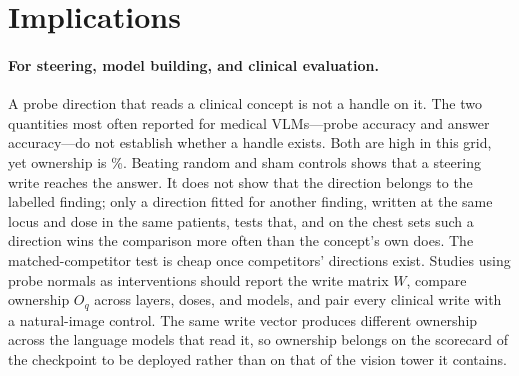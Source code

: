 \section{Implications}
\label{sec:implications}

\paragraph{For steering, model building, and clinical evaluation.}
A probe direction that reads a clinical concept is not a handle on it. The two quantities most often reported for medical VLMs---probe accuracy and answer accuracy---do not establish whether a handle exists. Both are high in this grid, yet ownership is \cfChestOwnedPct\%. Beating random and sham controls shows that a steering write reaches the answer. It does not show that the direction belongs to the labelled finding; only a direction fitted for another finding, written at the same locus and dose in the same patients, tests that, and on the chest sets such a direction wins the comparison more often than the concept's own does. The matched-competitor test is cheap once competitors' directions exist. Studies using probe normals as interventions should report the write matrix $W$, compare ownership $O_q$ across layers, doses, and models, and pair every clinical write with a natural-image control. The same write vector produces different ownership across the language models that read it, so ownership belongs on the scorecard of the checkpoint to be deployed rather than on that of the vision tower it contains.
